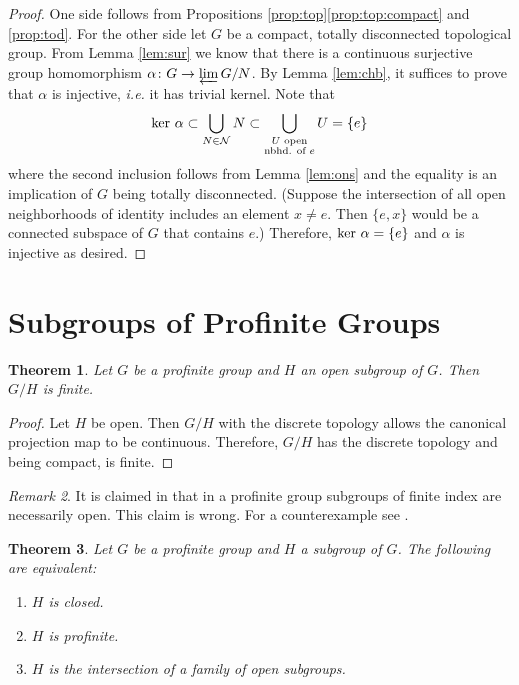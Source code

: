 \documentclass[12pt]{article}
\newtheorem{thm}{Theorem}[section]
\theoremstyle{definition}
\theoremstyle{remark}
\newtheorem{rem}[thm]{Remark}
\newcommand*{\nor}{\mathcal{N}}
\begin{document}
    \begin{proof}
        One side follows from Propositions \ref{prop:top}\ref{prop:top:compact} and \ref{prop:tod}. For the other side let $G$ be a compact, totally disconnected topological group. From Lemma \ref{lem:sur} we know that there is a continuous surjective group homomorphism $\alpha\colon G\to\varprojlim G/N$. By Lemma \ref{lem:chb}, it suffices to prove that $\alpha$ is injective, \emph{i.e.} it has trivial kernel. Note that
        $$
        \textup{ker }\alpha \subset \bigcup_{N\in\nor} N \subset \bigcup_{\substack{U \text{ open} \\ \text{nbhd. of } e}} U = \{e\}
        $$
        where the second inclusion follows from Lemma \ref{lem:ons} and the equality is an implication of $G$ being totally disconnected. (Suppose the intersection of all open neighborhoods of identity includes an element $x\neq e$. Then $\{e,x\}$ would be a connected subspace of $G$ that contains $e$.) Therefore, $\textup{ker }\alpha=\{e\}$ and $\alpha$ is injective as desired.
    \end{proof}

    \section{Subgroups of Profinite Groups}

    \begin{thm}
        Let $G$ be a profinite group and $H$ an open subgroup of $G$. Then $G/H$ is finite.  
    \end{thm}

    \begin{proof}
        Let $H$ be open. Then $G/H$ with the discrete topology allows the canonical projection map to be continuous. Therefore, $G/H$ has the discrete topology and being compact, is finite.
    \end{proof}

    \begin{rem}
        It is claimed in \cite*[Proposition 1-18]{FANF1999} that in a profinite group subgroups of finite index are necessarily open. This claim is wrong. For a counterexample see \cite*[Proposition 7.29]{milneFT}.
    \end{rem}

    \begin{thm}
        Let $G$ be a profinite group and $H$ a subgroup of $G$. The following are equivalent:
        \begin{enumerate}[label=\emph{(\roman*)}]
            \item $H$ is closed.
            \item $H$ is profinite.
            \item $H$ is the intersection of a family of open subgroups.
        \end{enumerate}
    \end{thm}
\end{document}
